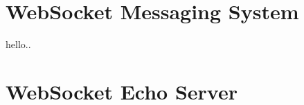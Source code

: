 \chapter{WebSocket Messaging System}
\label{chapter:appendix-websocketMessagingSystem}

hello..

\chapter{WebSocket Echo Server}
\label{chapter:appendix-websocketEchoServer}

%
%
%
%
%

%
%
%
%
%
%
%
%
%
%
%
%
%
%
%
%
%
%
%
